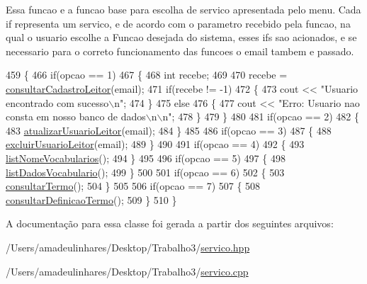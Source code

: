 Essa funcao e a funcao base para escolha de servico apresentada pelo menu. Cada if representa um servico, e de acordo com o parametro recebido pela funcao, na qual o usuario escolhe a Funcao desejada do sistema, esses if\textquotesingle{}s sao acionados, e se necessario para o correto funcionamento das funcoes o email tambem e passado.
\begin{DoxyCode}
459 \{
466   \textcolor{keywordflow}{if}(opcao == 1)
467   \{
468     \textcolor{keywordtype}{int} recebe;
469 
470     recebe = \mbox{\hyperlink{class_servico_usuarios_leitor_a8f34dddc0540f729a701d69f948ffb42}{consultarCadastroLeitor}}(email);
471     \textcolor{keywordflow}{if}(recebe != -1)
472     \{
473       cout << \textcolor{stringliteral}{"Usuario encontrado com sucesso\(\backslash\)n"};
474     \}
475     \textcolor{keywordflow}{else}
476     \{
477       cout << \textcolor{stringliteral}{"Erro: Usuario nao consta em nosso banco de dados\(\backslash\)n\(\backslash\)n"};
478     \}
479   \}
480 
481   \textcolor{keywordflow}{if}(opcao == 2)
482   \{
483     \mbox{\hyperlink{class_servico_usuarios_leitor_ad77426aecdda591b99ecbf8259a05b2d}{atualizarUsuarioLeitor}}(email);
484   \}
485 
486   \textcolor{keywordflow}{if}(opcao == 3)
487   \{
488     \mbox{\hyperlink{class_servico_usuarios_leitor_adce08fccebc11dbd5f395b8a4bb23d2a}{excluirUsuarioLeitor}}(email);
489   \}
490 
491   \textcolor{keywordflow}{if}(opcao == 4)
492   \{
493     \mbox{\hyperlink{class_servico_usuarios_leitor_a376f7cdbdea50d9a01ce611e79d346c4}{listNomeVocabularios}}();
494   \}
495 
496   \textcolor{keywordflow}{if}(opcao == 5)
497   \{
498     \mbox{\hyperlink{class_servico_usuarios_leitor_a4f533d318634c95d3f756a45c7613047}{listDadosVocabulario}}();
499   \}
500 
501   \textcolor{keywordflow}{if}(opcao == 6)
502   \{
503     \mbox{\hyperlink{class_servico_usuarios_leitor_a79d3a1814ad33930aae0c3a74c879e92}{consultarTermo}}();
504   \}
505 
506   \textcolor{keywordflow}{if}(opcao == 7)
507   \{
508     \mbox{\hyperlink{class_servico_usuarios_leitor_a89ed39e45ee1c564e1f62df7154d1b29}{consultarDefinicaoTermo}}();
509   \}
510 \}
\end{DoxyCode}


A documentação para essa classe foi gerada a partir dos seguintes arquivos\+:\begin{DoxyCompactItemize}
\item 
/\+Users/amadeulinhares/\+Desktop/\+Trabalho3/\mbox{\hyperlink{servico_8hpp}{servico.\+hpp}}\item 
/\+Users/amadeulinhares/\+Desktop/\+Trabalho3/\mbox{\hyperlink{servico_8cpp}{servico.\+cpp}}\end{DoxyCompactItemize}
